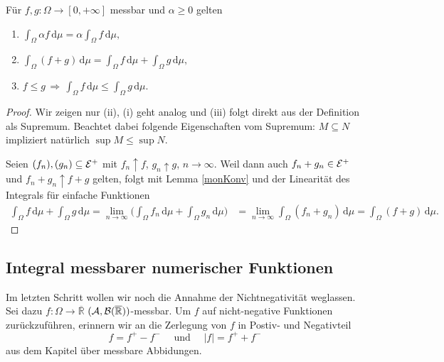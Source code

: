 \begin{lemma}\label{RRnichtneg}
	Für $f,g \! : \Omega \rightarrow [0,+\infty]$ messbar und $ \alpha \geq 0$ gelten
	\begin{enumerate}[label=(\roman*)]
		\item $\int_{\Omega} \alpha f \,\mathrm{d}\mu = \alpha \int_{\Omega} f \,\mathrm{d}\mu,$
		\item $\int_{\Omega} (f + g)\, \mathrm{d}\mu = \int_{\Omega} f \,\mathrm{d}\mu + \int_{\Omega} g \,\mathrm{d}\mu,$
		\item $f \leq g \, \Rightarrow\, \int_{\Omega} f\, \mathrm{d}\mu \leq \int_{\Omega} g\, \mathrm{d}\mu.$
	\end{enumerate}
\end{lemma}

\begin{proof}
	Wir zeigen nur (ii), (i) geht analog und (iii) folgt direkt aus der Definition als Supremum. Beachtet dabei folgende Eigenschaften vom Supremum: $M\subseteq N$ impliziert nat\"urlich $\sup M\leq \sup N$.\smallskip
	
		Seien $(f_n), (g_n) \subseteq \mathcal{E}^+$ mit $f_n \uparrow f$, $g_n \uparrow g$, $n \to \infty$. Weil dann auch $f_n+g_n \in \mathcal{E}^+$ und $f_n+g_n\uparrow f+g$ gelten, folgt mit Lemma \ref{monKonv} und der Linearit\"at des Integrals f\"ur einfache Funktionen
		\begin{align*}
			 \int_{\Omega} f \,\mathrm{d}\mu + \int_{\Omega} g\, \mathrm{d}\mu=\lim_{n\to\infty}\Big(\int_{\Omega} f_n\, \mathrm{d}\mu + \int_{\Omega} g_n \,\mathrm{d}\mu\Big)  &=\lim_{n\to\infty} \int_{\Omega} (f_n + g_n)\, \mathrm{d}\mu=\int_{\Omega} (f + g)\, \mathrm{d}\mu.
		\end{align*}
\end{proof}

\subsection*{Integral messbarer numerischer Funktionen}
Im letzten Schritt wollen wir noch die Annahme der Nichtnegativit\"at weglassen. Sei dazu $f \! : \Omega \rightarrow \overline{\mathbb{R}}$ $(\mathcal{A}, \mathcal{B}(\mathbb{\overline R}))$-messbar. Um $f$ auf nicht-negative Funktionen zur\"uckzuf\"uhren, erinnern wir an die Zerlegung von $f$ in Postiv- und Negativteil $$f = f^+ - f^-\quad \text{ und }\quad |f| = f^+ + f^-$$ aus dem Kapitel \"uber messbare Abbidungen.

